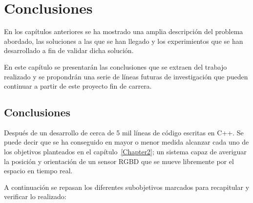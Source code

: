 
\chapter{Conclusiones}

\label{Chapter6} %

En los capítulos anteriores se ha mostrado una amplia descripción del problema abordado, las soluciones a las que se han llegado y los experimientos que se han desarrollado a fin de validar dicha solución.

En este capítulo se presentarán las conclusiones que se extraen del trabajo realizado y se propondrán una serie de líneas futuras de investigación que pueden continuar a partir de este proyecto fin de carrera.

\section{Conclusiones}

Después de un desarrollo de cerca de 5 mil líneas de código escritas en C++. Se puede decir que se ha conseguido en mayor o menor medida alcanzar cada uno de los objetivos planteados en el capítulo~\ref{Chapter2}; un sistema capaz de averiguar la posición y orientación de un sensor RGBD que se mueve libremente por el espacio en tiempo real.

A continuación se repasan los diferentes subobjetivos marcados para recapitular y verificar lo realizado:


